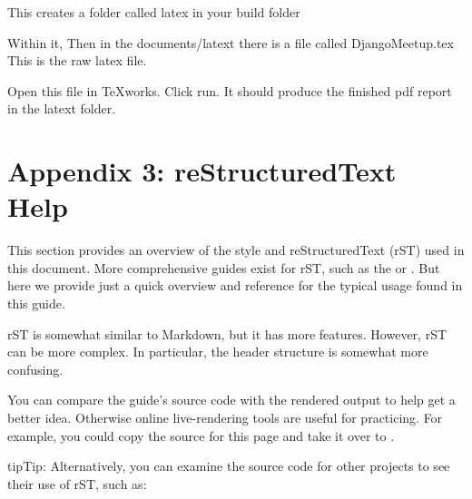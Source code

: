 \documentclass[letterpaper,10pt,english]{sphinxmanual}
\begin{document}

This creates a folder called latex in your build folder

Within it, Then in the documents/latext there is a file called DjangoMeetup.tex
This is the raw latex file.

Open this file in TeXworks.
Click run.
It should produce the finished pdf report in the latext folder.


\section{Appendix 3: reStructuredText Help}
\label{\detokenize{guide/99_rst-guide:appendix-3-restructuredtext-help}}\label{\detokenize{guide/99_rst-guide::doc}}\begin{quote}

\end{quote}

This section provides an overview of the style and reStructuredText (rST) used in this document. More comprehensive guides exist for rST, such as the  or .  But here we provide just a quick overview and reference for the typical usage found in this guide.

rST is somewhat similar to Markdown, but it has more features. However, rST can be more complex.  In particular, the header structure is somewhat more confusing.

You can compare the guide’s source code with the rendered output to help get a better idea.
Otherwise online live-rendering tools are useful for practicing.  For example, you could copy the source for this page and take it over to .

\begin{sphinxadmonition}{tip}{Tip:}
Alternatively, you can examine the source code for other projects to see their use of rST, such as:






\end{sphinxadmonition}
\end{document}
